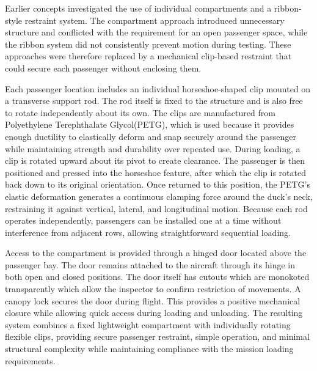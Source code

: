 \documentclass[10pt, letterpaper]{article}
\begin{document}
Earlier concepts investigated the use of individual compartments and a ribbon-style restraint system. The compartment approach introduced unnecessary structure and conflicted with the requirement for an open passenger space, while the ribbon system did not consistently prevent motion during testing. These approaches were therefore replaced by a mechanical clip-based restraint that could secure each passenger without enclosing them.

Each passenger location includes an individual horseshoe-shaped clip mounted on a transverse support rod. The rod itself is fixed to the structure and is also free to rotate independently about its own. The clips are manufactured from Polyethylene Terephthalate Glycol(PETG), which is used because it provides enough ductility to elastically deform and snap securely around the passenger while maintaining strength and durability over repeated use.
During loading, a clip is rotated upward about its pivot to create clearance. The passenger is then positioned and pressed into the horseshoe feature, after which the clip is rotated back down to its original orientation. Once returned to this position, the PETG's elastic deformation generates a continuous clamping force around the duck's neck, restraining it against vertical, lateral, and longitudinal motion. Because each rod operates independently, passengers can be installed one at a time without interference from adjacent rows, allowing straightforward sequential loading.

Access to the compartment is provided through a hinged door located above the passenger bay. The door remains attached to the aircraft through its hinge in both open and closed positions. The door itself has cutouts which are monokoted transparently which allow the inspector to confirm restriction of movements. A canopy lock secures the door during flight. This provides a positive mechanical closure while allowing quick access during loading and unloading.
The resulting system combines a fixed lightweight compartment with individually rotating flexible clips, providing secure passenger restraint, simple operation, and minimal structural complexity while maintaining compliance with the mission loading requirements.
\end{document}
